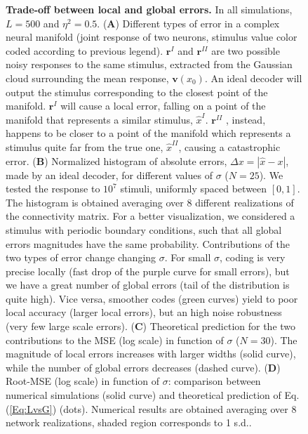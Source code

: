 \documentclass[a4paper]{article}
\begin{document}
\begin{figure}
\centering
{}
\caption{ \textbf{Trade-off between local and global errors.} In all simulations, $L=500$ and $\eta^2 = 0.5$.
(\textbf{A})  Different types of error in a complex neural manifold (joint response of two neurons, stimulus value color coded according to previous legend). $\mathbf{r}^{I}$ and  $\mathbf{r}^{II}$ are two possible noisy responses to the same stimulus, extracted from the Gaussian cloud surrounding the mean response, $\mathbf{v}(x_0)$. An ideal decoder will output the stimulus corresponding to the closest point of the manifold.  $\mathbf{r}^{I}$ will cause a local error, falling on a point of the manifold that represents a similar stimulus, $\hat{x}^I$.  $\mathbf{r}^{II}$ , instead, happens to be closer to a point of the manifold which represents a stimulus quite far from the true one, $\hat{x}^{II}$, causing a catastrophic error.
(\textbf{B}) Normalized histogram of absolute errors, $\Delta x = |\hat{x}-x|$, made by an ideal decoder, for different values of $\sigma$ ($N=25$). We tested the response to $10^7$ stimuli, uniformly spaced between $[0,1]$. The histogram is obtained averaging over 8 different realizations of the connectivity matrix. For a better visualization, we considered a stimulus with periodic boundary conditions, such that all global errors magnitudes have the same probability. Contributions of the two types of error change changing $\sigma$. For small $\sigma$, coding is very precise locally (fast drop of the purple curve for small errors), but we have a great number of global errors (tail of the distribution is quite high). Vice versa, smoother codes (green curves) yield to poor local accuracy (larger local errors), but an high noise robustness (very few large scale errors). 
(\textbf{C}) Theoretical prediction for the two contributions to the MSE (log scale) in function of $\sigma$ ($N=30$). The magnitude of local errors increases with larger widths (solid curve), while the number of global errors decreases (dashed curve).
(\textbf{D}) Root-MSE (log scale) in function of $\sigma$: comparison between numerical simulations (solid curve) and theoretical prediction of Eq.(\ref{Eq:LvsG}) (dots). Numerical results are obtained averaging over 8 network realizations, shaded region corresponds to 1 s.d..}
\label{Fig:3}
\end{figure}
\clearpage
\end{document}
